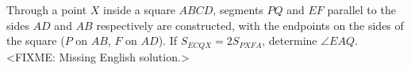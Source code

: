\problem
Through a point $X$ inside a square $ABCD$, segments $PQ$ and $EF$ parallel to
the sides $AD$ and $AB$ respectively are constructed, with the endpoints on the
sides of the square ($P$ on $AB$, $F$ on $AD$).
If $S_{ECQX} = 2 S_{PXFA}$, determine $\angle EAQ$.
\solution
<FIXME: Missing English solution.>
\endproblem

